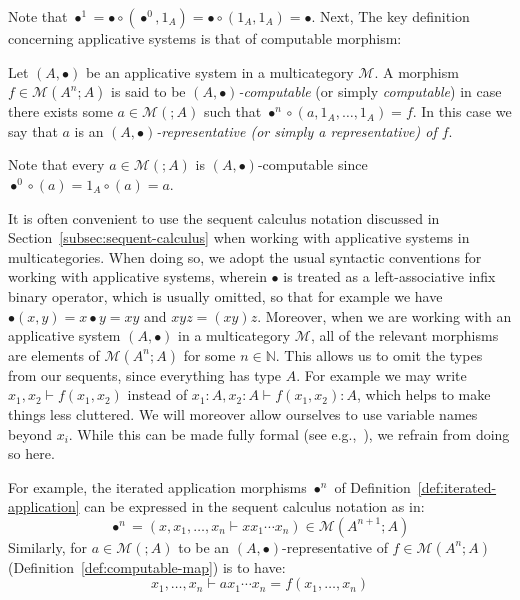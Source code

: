 \documentclass{llncs}
\newcommand{\application}{\bullet} %
\begin{document}
Note that $\bullet^1 = \bullet \circ (\bullet^0,1_A) = \bullet \circ (1_A,1_A) = \bullet$. Next, The key definition concerning applicative systems is that of computable morphism:
\begin{definition}\label{def:computable-map}
  Let $(A,\bullet)$ be an applicative system in a multicategory $\mathcal{M}$. A morphism $f \in \mathcal{M}(A^n;A)$ is said to be \emph{$(A,\bullet)$-computable} (or simply \emph{computable}) in case there exists some $a \in \mathcal{M}(;A)$ such that $\bullet^n \circ (a,1_A,\ldots,1_A) = f$. In this case we say that $a$ is an \emph{$(A,\bullet)$-representative (or simply a \emph{representative}) of $f$}.
\end{definition}
Note that every $a \in \mathcal{M}(;A)$ is $(A,\bullet)$-computable since $\bullet^0 \circ (a) = 1_A \circ (a) = a$. 

It is often convenient to use the sequent calculus notation discussed in Section~\ref{subsec:sequent-calculus} when working with applicative systems in multicategories. When doing so, we adopt the usual syntactic conventions for working with applicative systems, wherein $\bullet$ is treated as a left-associative infix binary operator, which is usually omitted, so that for example we have $\bullet(x,y) = x \bullet y = xy$ and $xyz = (xy)z$. Moreover, when we are working with an applicative system $(A,\application)$ in a multicategory $\mathcal{M}$, all of the relevant morphisms are elements of $\mathcal{M}(A^n;A)$ for some $n \in \mathbb{N}$. This allows us to omit the types from our sequents, since everything has type $A$. For example we may write $x_1,x_2 \vdash f(x_1,x_2)$ instead of $x_1 : A , x_2 : A \vdash f(x_1,x_2) : A$, which helps to make things less cluttered. We will moreover allow ourselves to use variable names beyond $x_i$. While this can be made fully formal (see e.g.,~\cite{Shulman2016}), we refrain from doing so here. 

For example, the iterated application morphisms $\bullet^n$ of Definition~\ref{def:iterated-application} can be expressed in the sequent calculus notation as in:
\[
  \bullet^n = (x,x_1,\ldots,x_n \vdash xx_1\cdots x_n) \in \mathcal{M}(A^{n+1};A)
\]
Similarly, for $a \in \mathcal{M}(;A)$ to be an $(A,\bullet)$-representative of $f \in \mathcal{M}(A^n;A)$ (Definition~\ref{def:computable-map}) is to have:
\[
  x_1,\ldots,x_n \vdash ax_1\cdots x_n = f(x_1,\ldots,x_n)
\]
\end{document}
